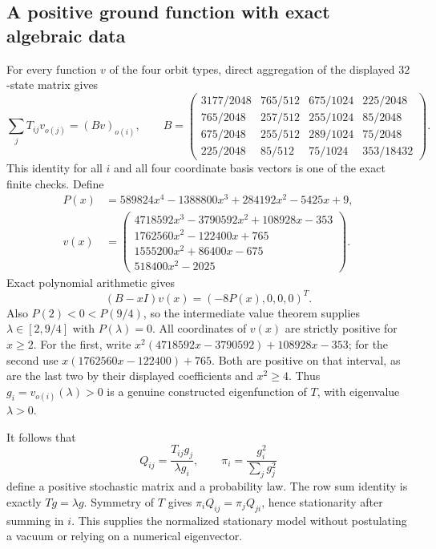 \documentclass[11pt]{article}
\begin{document}
\subsection*{A positive ground function with exact algebraic data}
For every function $v$ of the four orbit types, direct aggregation of
the displayed $32$-state matrix gives
\[
 \sum_jT_{ij}v_{o(j)}=(Bv)_{o(i)},\qquad
 B=\begin{pmatrix}
3177/2048&765/512&675/1024&225/2048\\
765/2048&257/512&255/1024&85/2048\\
675/2048&255/512&289/1024&75/2048\\
225/2048&85/512&75/1024&353/18432
\end{pmatrix}.
\]
This identity for all $i$ and all four coordinate basis vectors is one
of the exact finite checks. Define
\begin{align*}
 P(x)&=589824x^4-1388800x^3+284192x^2-5425x+9,\\
 v(x)&=\begin{pmatrix}
4718592x^3-3790592x^2+108928x-353\\
1762560x^2-122400x+765\\
1555200x^2+86400x-675\\
518400x^2-2025
\end{pmatrix}.
\end{align*}
Exact polynomial arithmetic gives
\[
 (B-xI)v(x)=(-8P(x),0,0,0)^T.
\]
Also $P(2)<0<P(9/4)$, so the intermediate value theorem supplies
$\lambda\in[2,9/4]$ with $P(\lambda)=0$. All coordinates of $v(x)$
are strictly positive for $x\geq2$. For the first, write
$x^2(4718592x-3790592)+108928x-353$; for the second use
$x(1762560x-122400)+765$. Both are positive on that interval, as are
the last two by their displayed coefficients and $x^2\geq4$.
Thus $g_i=v_{o(i)}(\lambda)>0$ is a genuine constructed eigenfunction
of $T$, with eigenvalue $\lambda>0$.

It follows that
\[
 Q_{ij}=\frac{T_{ij}g_j}{\lambda g_i},\qquad
 \pi_i=\frac{g_i^2}{\sum_jg_j^2}
\]
define a positive stochastic matrix and a probability law. The row sum
identity is exactly $Tg=\lambda g$. Symmetry of $T$ gives
$\pi_iQ_{ij}=\pi_jQ_{ji}$, hence stationarity after summing in $i$.
This supplies the normalized stationary model without postulating a
vacuum or relying on a numerical eigenvector.
\end{document}
